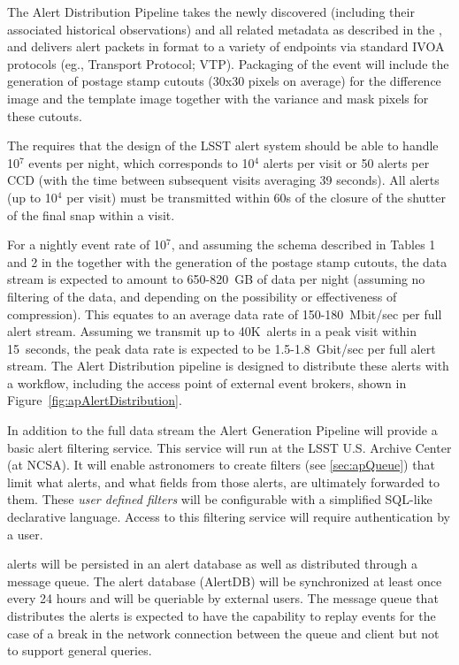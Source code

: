 The Alert Distribution Pipeline takes the newly discovered \DIAObjects (including their associated historical observations) and all related metadata as described in the \DPDD, and delivers alert packets in \VOEvent format to a variety of endpoints via standard IVOA protocols (eg., \VOEvent Transport Protocol; VTP\@). Packaging of the event will include the generation of postage stamp cutouts (30x30 pixels on average) for the difference image and the template image together with the variance and mask pixels for these cutouts.

The \SRD requires that the design of the LSST alert system should be able to handle 10$^7$ events per night, which corresponds to 10$^4$ alerts per visit or 50 alerts per CCD (with the time between subsequent visits averaging 39 seconds). All alerts (up to 10$^4$ per visit) must be transmitted within 60s of the closure of the shutter of the final snap within a visit.

For a nightly event rate of 10$^7$, and assuming the schema described in Tables 1 and 2 in the \DPDD together with the generation of the postage stamp cutouts, the \VOEvents data stream is expected to amount to 650-820~GB of data per night (assuming no filtering of the data, and depending on the possibility or effectiveness of compression). This equates to an average data rate of 150-180~Mbit/sec per full alert stream. Assuming we transmit up to 40K~alerts in a peak visit within 15~seconds, the peak data rate is expected to be 1.5-1.8~Gbit/sec per full alert stream. The Alert Distribution pipeline is designed to distribute these alerts with a workflow, including the access point of external event brokers, shown in Figure~\ref{fig:apAlertDistribution}.

In addition to the full data stream the Alert Generation Pipeline will provide a basic alert filtering service. This service will run at the LSST U.S. Archive Center (at NCSA). It will enable astronomers to create filters (see  \ref{sec:apQueue}) that limit what alerts, and what fields from those alerts, are ultimately forwarded to them. These \emph{user defined filters} will be configurable with a simplified SQL-like declarative language. Access to this filtering service will require authentication by a user.

\VOEvent alerts will be persisted in an alert database as well as distributed through a message queue. The alert database (AlertDB) will be synchronized at least once every 24 hours and will be queriable by external users. The message queue that distributes the alerts is expected to have the capability  to replay events for the case of a break in the network connection between the queue and client but not to support general queries.

